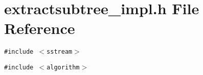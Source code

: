\section{extractsubtree\_\-impl.h File Reference}
\label{extractsubtree__impl_8h}
{\tt \#include $<$sstream$>$}\par
{\tt \#include $<$algorithm$>$}\par
